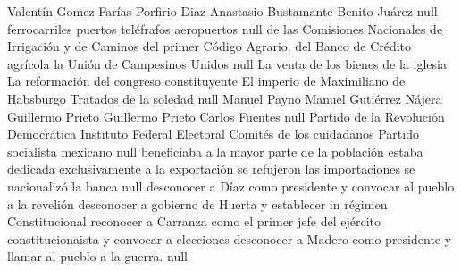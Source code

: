 \documentclass[10pt,a4paper]{article}
\begin{document}
\begin{multicols*}{2}
				{Valentín Gomez Farías}
 				{Porfirio Diaz}
				{Anastasio Bustamante}
				{Benito Juárez}
			{null}
				{ferrocarriles}
				{puertos}
				{teléfrafos}
				{aeropuertos}
			{null}
				{de las Comisiones Nacionales de Irrigación y de Caminos}
				{del primer Código Agrario.}
				{del Banco de Crédito agrícola}
				{la Unión de Campesinos Unidos}
			{null}
				{La venta de los bienes de la iglesia}
				{La reformación del congreso constituyente}
				{El imperio de Maximiliano de Habsburgo}
				{Tratados de la soledad}
			{null}
				{Manuel Payno}
				{Manuel Gutiérrez Nájera}
				{Guillermo Prieto}
				{Guillermo Prieto}
				{Carlos Fuentes}
			{null}
				{Partido de la Revolución Democrática}
				{Instituto Federal Electoral}
				{Comités de los cuidadanos}
				{Partido socialista mexicano}
			{null}
				{beneficiaba a la mayor parte de la población}
				{estaba dedicada exclusivamente a la exportación}
				{se refujeron las importaciones}
				{se nacionalizó la banca }
			{null}
				{desconocer a Díaz como presidente y convocar al pueblo a la revelión }
				{desconocer a gobierno de Huerta y establecer in régimen Constitucional}
				{reconocer a Carranza como el primer jefe del ejército constitucionaista y convocar a elecciones}
				{desconocer a Madero como presidente y llamar al pueblo a la guerra.}
			{null}

\end{multicols*}
\end{document}
